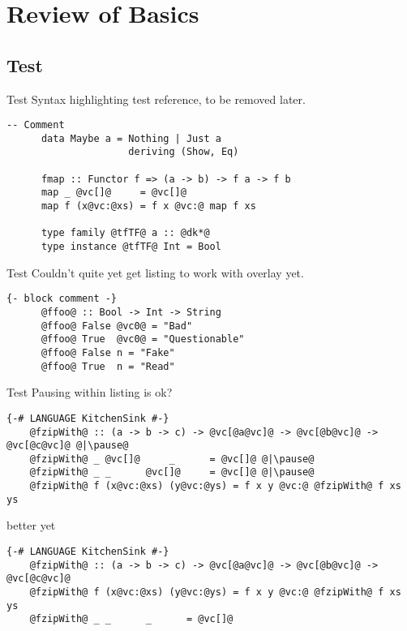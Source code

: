 \documentclass[xcolor={usenames,dvipsnames}]{beamer}
\begin{document}
\section{Review of Basics}

\subsection{Test}
\begin{frame}[fragile]{Test}
  Syntax highlighting test reference, to be removed later.

  \begin{lstlisting}[style=hask]
      -- Comment
      data Maybe a = Nothing | Just a
                     deriving (Show, Eq)
 
      fmap :: Functor f => (a -> b) -> f a -> f b
      map _ @vc[]@     = @vc[]@
      map f (x@vc:@xs) = f x @vc:@ map f xs
 
      type family @tfTF@ a :: @dk*@
      type instance @tfTF@ Int = Bool
  \end{lstlisting}
\end{frame}

\begin{frame}[fragile]{Test}
  Couldn't quite yet get listing to work with overlay yet.

  \begin{lstlisting}[style=hask]
      {- block comment -}
      @ffoo@ :: Bool -> Int -> String
      @ffoo@ False @vc0@ = "Bad"
      @ffoo@ True  @vc0@ = "Questionable"
      @ffoo@ False n = "Fake"
      @ffoo@ True  n = "Read"
  \end{lstlisting}
\end{frame}

\begin{frame}[fragile]{Test}
  Pausing within listing is ok?

  \begin{lstlisting}[style=hask]
    {-# LANGUAGE KitchenSink #-}
    @fzipWith@ :: (a -> b -> c) -> @vc[@a@vc]@ -> @vc[@b@vc]@ -> @vc[@c@vc]@ @|\pause@
    @fzipWith@ _ @vc[]@     _      = @vc[]@ @|\pause@
    @fzipWith@ _ _      @vc[]@     = @vc[]@ @|\pause@
    @fzipWith@ f (x@vc:@xs) (y@vc:@ys) = f x y @vc:@ @fzipWith@ f xs ys
  \end{lstlisting}

  better yet

  \begin{lstlisting}[style=hask]
    {-# LANGUAGE KitchenSink #-}
    @fzipWith@ :: (a -> b -> c) -> @vc[@a@vc]@ -> @vc[@b@vc]@ -> @vc[@c@vc]@
    @fzipWith@ f (x@vc:@xs) (y@vc:@ys) = f x y @vc:@ @fzipWith@ f xs ys
    @fzipWith@ _ _      _      = @vc[]@
  \end{lstlisting}
\end{frame}
\end{document}
